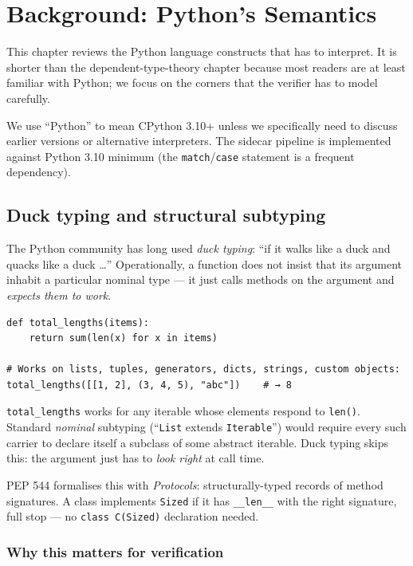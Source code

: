 \chapter{Background: Python's Semantics}
\label{ch:python}

This chapter reviews the Python language constructs that \Deppy{} has
to interpret.  It is shorter than the dependent-type-theory chapter
because most readers are at least familiar with Python; we focus on
the corners that the verifier has to model carefully.

We use ``Python'' to mean CPython 3.10+ unless we specifically need
to discuss earlier versions or alternative interpreters.  The
sidecar pipeline is implemented against Python 3.10 minimum (the
\texttt{match}/\texttt{case} statement is a frequent dependency).

\section{Duck typing and structural subtyping}
\label{sec:duck}

The Python community has long used \emph{duck typing}: ``if it walks
like a duck and quacks like a duck \dots''  Operationally, a
function does not insist that its argument inhabit a particular
nominal type --- it just calls methods on the argument and
\emph{expects them to work}.

\begin{lstlisting}[language=psdl, caption={Duck typing in idiomatic
Python.}]
def total_lengths(items):
    return sum(len(x) for x in items)

# Works on lists, tuples, generators, dicts, strings, custom objects:
total_lengths([[1, 2], (3, 4, 5), "abc"])    # → 8
\end{lstlisting}

\texttt{total\_lengths} works for any iterable whose elements
respond to \texttt{len()}.  Standard \emph{nominal} subtyping
(``\texttt{List} extends \texttt{Iterable}'') would require every
such carrier to declare itself a subclass of some abstract iterable.
Duck typing skips this: the argument just has to \emph{look right}
at call time.

PEP 544 \citep{PEP544} formalises this with \emph{Protocols}:
structurally-typed records of method signatures.  A class implements
\verb|Sized| if it has \verb|__len__| with the right signature, full
stop --- no \verb|class C(Sized)| declaration needed.

\subsection{Why this matters for verification}

